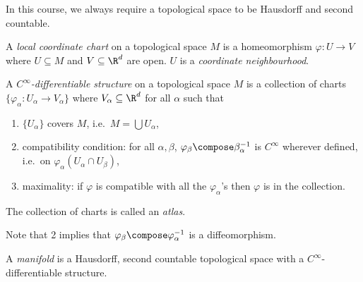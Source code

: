 \documentclass[a4paper]{article}
\begin{document}
In this course, we always require a topological space to be Hausdorff and second countable.

\begin{definition}
  A \emph{local coordinate chart} on a topological space \(M\) is a homeomorphism \(\varphi: U \to V\) where \(U \subseteq M\) and \(V \subseteq \R^d\) are open. \(U\) is a \emph{coordinate neighbourhood}.
\end{definition}

\begin{definition}
  A \emph{\(C^\infty\)-differentiable structure} on a topological space \(M\) is a collection of charts \(\{\varphi_\alpha: U_\alpha \to V_\alpha\}\) where \(V_\alpha \subseteq \R^d\) for all \(\alpha\) such that
    \begin{enumerate}
    \item \(\{U_\alpha\}\) covers \(M\), i.e.\ \(M = \bigcup U_\alpha\),
    \item compatibility condition: for all \(\alpha, \beta\), \(\varphi_\beta \compose \beta_\alpha^{-1}\) is \(C^\infty\) wherever defined, i.e.\ on \(\varphi_\alpha(U_\alpha \cap U_\beta)\),
    \item maximality: if \(\varphi\) is compatible with all the \(\varphi_\alpha\)'s then \(\varphi\) is in the collection.
    \end{enumerate}
    
    The collection of charts is called an \emph{atlas}.
\end{definition}

Note that 2 implies that \(\varphi_\beta \compose \varphi_\alpha^{-1}\) is a diffeomorphism.

\begin{definition}[manifold]
  A \emph{manifold} is a Hausdorff, second countable topological space with a \(C^\infty\)-differentiable structure.
\end{definition}
\end{document}
